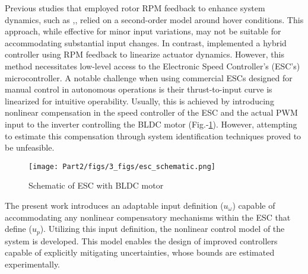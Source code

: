 Previous studies that employed rotor RPM feedback to enhance system dynamics, such as
\cite{pounds2009design},\cite{pounds2007system},\cite{mahony2012multirotor} relied on a second-order model around hover
conditions. This approach, while effective for minor input variations, may not be suitable for accommodating substantial
input changes. In contrast, \cite{franchi2017adaptive} implemented a hybrid controller using RPM feedback to linearize
actuator dynamics. However, this method necessitates low-level access to the Electronic Speed Controller's (ESC's)
microcontroller. A notable challenge when using commercial ESCs designed for manual control in autonomous operations is
their thrust-to-input curve is linearized for intuitive operability. Usually, this is achieved by introducing nonlinear
compensation in the speed controller of the ESC and the actual PWM input to the inverter controlling the BLDC motor
(Fig.-\ref{fig::bldc_diag}). However, attempting to estimate this compensation through system identification techniques
proved to be unfeasible.
\begin{figure}[h]
    \centering
    \texttt{[image: Part2/figs/3\_figs/esc\_schematic.png]}
    \caption{Schematic of ESC with BLDC motor}
    \label{fig::bldc_diag}
\end{figure}

The present work introduces an adaptable input definition ($u_\omega$) capable of accommodating any nonlinear
compensatory mechanisms within the ESC that define ($u_p$). Utilizing this input definition, the nonlinear control model
of the system is developed. This model enables the design of improved controllers capable of explicitly mitigating
uncertainties, whose bounds are estimated experimentally.
